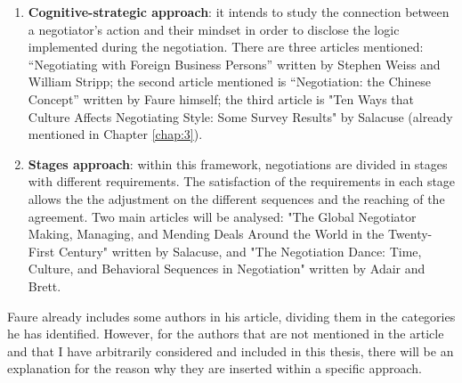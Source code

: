 \documentclass[../main.tex]{subfiles}
\begin{document}
\begin{enumerate}
\item \textbf{Cognitive-strategic approach}: it intends to study the connection between a negotiator's action and their mindset in order to disclose the logic implemented during the negotiation.
There are three articles mentioned: “Negotiating with Foreign Business Persons” written by Stephen Weiss and William Stripp; the second article mentioned is “Negotiation: the Chinese Concept” written by Faure himself; the third article is "Ten Ways that Culture Affects Negotiating Style: Some Survey Results" by Salacuse (already mentioned in Chapter \ref{chap:3}).
\item \textbf{Stages approach}: within this framework, negotiations are divided in stages with different requirements. The satisfaction of the requirements in each stage allows the the adjustment on the different sequences and the reaching of the agreement.
Two main articles will be analysed: "The Global Negotiator Making, Managing, and Mending Deals Around the World in the Twenty-First Century" written by Salacuse, and "The Negotiation Dance: Time, Culture, and Behavioral Sequences in Negotiation" written by Adair and Brett.
\end{enumerate} %

Faure already includes some authors in his article, dividing them in the categories he has identified. However, for the authors that are not mentioned in the article and that I have arbitrarily considered and included in this thesis, there will be an explanation for the reason why they are inserted within a specific approach.
\end{document}
